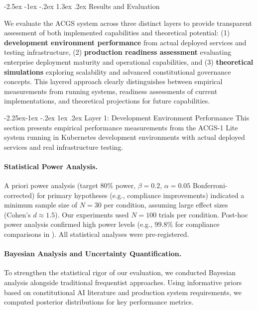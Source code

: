 \documentclass[manuscript,screen,9pt]{acmart}
\makeatletter
\renewcommand\section{\@startsection{section}{1}{\z@}%
  {-2.5ex \@plus -1ex \@minus -.2ex}%
  {1.3ex \@plus.2ex}%
  {\normalfont\Large\bfseries}}
\renewcommand\subsection{\@startsection{subsection}{2}{\z@}%
  {-2.25ex\@plus -1ex \@minus -.2ex}%
  {1ex \@plus .2ex}%
  {\normalfont\large\bfseries}}
\makeatother
\begin{document}
\section{Results and Evaluation}
\label{sec:results}

We evaluate the ACGS system across three distinct layers to provide transparent assessment of both implemented capabilities and theoretical potential: (1) \textbf{development environment performance} from actual deployed services and testing infrastructure, (2) \textbf{production readiness assessment} evaluating enterprise deployment maturity and operational capabilities, and (3) \textbf{theoretical simulations} exploring scalability and advanced constitutional governance concepts. This layered approach clearly distinguishes between empirical measurements from running systems, readiness assessments of current implementations, and theoretical projections for future capabilities.

\subsection{Layer 1: Development Environment Performance}
\label{subsec:development_performance}
This section presents empirical performance measurements from the ACGS-1 Lite system running in Kubernetes development environments with actual deployed services and real infrastructure testing.

\paragraph{Statistical Power Analysis.}
\label{subsec:power_analysis}
A priori power analysis (target 80\% power, $\beta = 0.2$, $\alpha = 0.05$ Bonferroni-corrected) for primary hypotheses (e.g., compliance improvements) indicated a minimum sample size of $N=30$ per condition, assuming large effect sizes (Cohen's $d \approx 1.5$). Our experiments used $N=100$ trials per condition. Post-hoc power analysis confirmed high power levels (e.g., 99.8\% for compliance comparisons in ). All statistical analyses were pre-registered.

\paragraph{Bayesian Analysis and Uncertainty Quantification.}
\label{subsec:bayesian_analysis}
To strengthen the statistical rigor of our evaluation, we conducted Bayesian analysis alongside traditional frequentist approaches. Using informative priors based on constitutional AI literature and production system requirements, we computed posterior distributions for key performance metrics.
\end{document}
